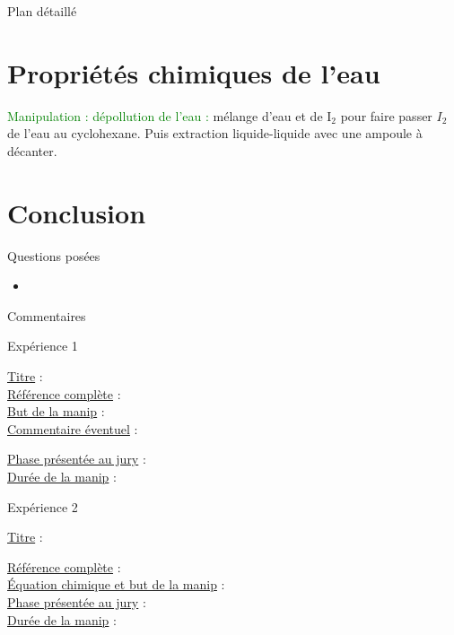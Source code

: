 \begin{reportBlock}{Plan détaillé}
\section{Propriétés chimiques de l'eau}

\textcolor{green}{Manipulation : dépollution de l'eau :} mélange d'eau et de I$_2$ pour faire passer $I_2$ de l'eau au cyclohexane. Puis extraction liquide-liquide avec une ampoule à décanter.

\section{Conclusion} 


\end{reportBlock}

\begin{reportBlock}{Questions posées}

\begin{itemize}

\item 
\textcolor{purple}{}

\end{itemize}


\end{reportBlock}

\begin{reportBlock}{Commentaires}

\end{reportBlock}


\begin{reportBlock}{Expérience 1}

\underline{Titre} :  \\

\underline{Référence complète} :  \\ 

\underline{But de la manip} : \\

\underline{Commentaire éventuel} : 

\underline{Phase présentée au jury} :\\

\underline{Durée de la manip} : \\

\end{reportBlock}



\begin{reportBlock}{Expérience 2}

\underline{Titre} : 

\underline{Référence complète} :  \\ 

\underline{Équation chimique et but de la manip} : \\

\underline{Phase présentée au jury} :  \\

\underline{Durée de la manip} : \\

\end{reportBlock}


